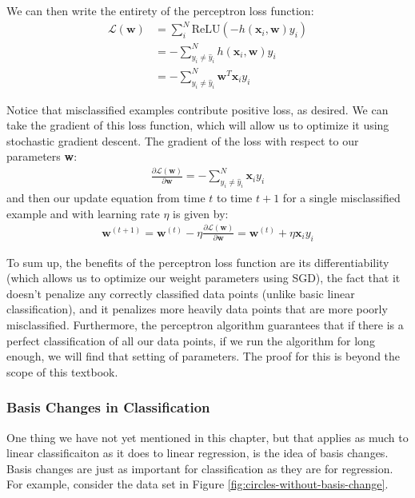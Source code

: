 We can then write the entirety of the perceptron loss function:
\begin{align}
	\mathcal{L}(\textbf{w}) &= \sum_{i}^{N} \text{ReLU}(-h(\textbf{x}_{i}, \textbf{w})y_{i}) \\
	&= -\sum_{y_{i} \neq \hat{y}_{i}}^{N} h(\textbf{x}_{i}, \textbf{w})y_{i} \\
	&= -\sum_{y_{i} \neq \hat{y}_{i}}^{N} \textbf{w}^{T}\textbf{x}_{i} y_{i}
\end{align}

Notice that misclassified examples contribute positive loss, as desired. We can take the gradient of this loss function, which will allow us to optimize it using stochastic gradient descent. The gradient of the loss with respect to our parameters \textbf{w}:
\begin{align*}
	\frac{\partial \mathcal{L}(\textbf{w})}{\partial \textbf{w}} = -\sum_{y_{i} \neq \hat{y}_{i}}^{N} \textbf{x}_{i} y_{i}
\end{align*}
and then our update equation from time $t$ to time $t+1$ for a single misclassified example and with learning rate $\eta$ is given by:
\begin{align*}
	\textbf{w}^{(t+1)} = \textbf{w}^{(t)} - \eta\frac{\partial \mathcal{L}(\textbf{w})}{\partial \textbf{w}} = \textbf{w}^{(t)} + \eta \textbf{x}_{i} y_{i}
\end{align*}

To sum up, the benefits of the perceptron loss function are its differentiability (which allows us to optimize our weight parameters using SGD), the fact that it doesn't penalize any correctly classified data points (unlike basic linear classification), and it penalizes more heavily data points that are more poorly misclassified. Furthermore, the perceptron algorithm guarantees that if there is a perfect classification of all our data points, if we run the algorithm for long enough, we will find that setting of parameters. The proof for this is beyond the scope of this textbook.

\subsubsection{Basis Changes in Classification}
One thing we have not yet mentioned in this chapter, but that applies as much to linear classificaiton as it does to linear regression, is the idea of basis changes. Basis changes are just as important for classification as they are for regression. For example, consider the data set in Figure \ref{fig:circles-without-basis-change}.

